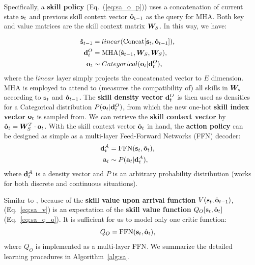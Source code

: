 Specifically, a \textbf{skill policy} (Eq.~(\ref{eq:sa_o_p}))
uses a concatenation of current state ${\mathbf{s}}_t$ and previous skill
context vector $\hat{{\mathbf{o}}}_{t-1}$ as the query for MHA. Both key
and value matrices are the skill context matrix ${\bm{W}}_S$. In this
way, we have:

\begin{align}
  \label{eq:sa_net_skill_concat}
  \hat{{\mathbf{s}}}_{t-1} &= linear(\text{Concat}[{\mathbf{s}}_t,\hat{{\mathbf{o}}}_{t-1}]),\\
  \label{eq:sa_net_skill_mha}
  {\mathbf{d}}^O_t &= \text{MHA}(\hat{{\mathbf{s}}}_{t-1},{\bm{W}}_S,{\bm{W}}_S),\\
  \label{eq:sa_net_skill_sample}
  {\mathbf{o}}_t &\sim Categorical({\mathbf{o}}_t|{\mathbf{d}}^O_t),
\end{align}
where the $linear$ layer simply projects the concatenated vector
to $E$ dimension. MHA is employed to attend to (measures the
compatibility of) all skills in ${\bm{W}}_s$ according to ${\mathbf{s}}_t$ and
$\hat{{\mathbf{o}}}_{t-1}$. The \textbf{skill density vector} ${\mathbf{d}}^O_t$
is then used as densities for a Categorical distribution
$P({\mathbf{o}}_t|{\mathbf{d}}^O_t)$, from which the new one-hot \textbf{skill
  index vector} ${\mathbf{o}}_t$ is sampled from. We can retrieve the
\textbf{skill context vector} by $\hat{{\mathbf{o}}}_t =
{\bm{W}}_S^T\cdot{\mathbf{o}}_t$. With the skill context vector $\hat{{\mathbf{o}}}_t$
in hand, the \textbf{action policy} can be designed as simple as
a multi-layer Feed-Forward Networks (FFN) decoder:
\begin{align}
  \label{eq:sa_net_action_concat}
  {\mathbf{d}}^A_t &= \text{FFN}({\mathbf{s}}_t,\hat{{\mathbf{o}}}_{t}),\\
  \label{eq:sa_net_action_sample}
  {\mathbf{a}}_t &\sim P({\mathbf{a}}_t|{\mathbf{d}}^A_t),
\end{align}
where ${\mathbf{d}}^A_t$ is a density vector and $P$ is an arbitrary
probability distribution (works for both discrete and continuous
situations).

Similar to , because of the \textbf{skill
  value upon arrival function} $V({\mathbf{s}}_t,\hat{{\mathbf{o}}}_{t-1})$,
(Eq.~\ref{eq:sa_v}) is an expectation of the \textbf{skill value
  function} $Q_O[{\mathbf{s}}_{t},\hat{{\mathbf{o}}}_{t}]$ (Eq.~\ref{eq:sa_q_o}).
It is sufficient for us to model only one critic function:
\begin{equation}
  \label{eq:nn_o_input}
  Q_O=\text{FFN}({\mathbf{s}}_t,\hat{{\mathbf{o}}}_t),
\end{equation}
where $Q_O$ is implemented as a multi-layer FFN. We summarize the
detailed learning procedures in Algorithm~\ref{alg:sa}.

